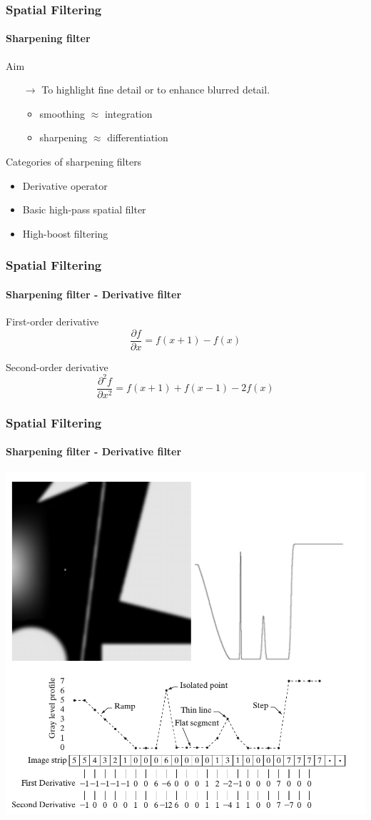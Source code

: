 \documentclass[table]{beamer}
\begin{document}
\begin{frame}
\frametitle{Spatial Filtering}
\framesubtitle{Sharpening filter}
\begin{block}{Aim}
\begin{itemize}
\item[$\rightarrow$] To highlight fine detail or to enhance blurred detail. 
\begin{itemize}
\item smoothing $\approx$ integration
\item sharpening $\approx$ differentiation
\end{itemize}
\end{itemize}
\end{block}
\begin{block}{Categories of sharpening filters}
\begin{itemize}
\item Derivative operator 
\item Basic high-pass spatial filter 
\item High-boost filtering 
\end{itemize}
\end{block}
\end{frame}
\begin{frame}
\frametitle{Spatial Filtering}
\framesubtitle{Sharpening filter - Derivative filter}
\begin{block}{First-order derivative}
$$\frac{\partial f}{\partial x} = f(x+1) - f(x)$$
\end{block}
\begin{block}{Second-order derivative}
$$\frac{\partial^{2}f}{\partial x^{2}} = f(x+1)+f(x-1) - 2f(x)$$
\end{block}
\end{frame}
\begin{frame}
\frametitle{Spatial Filtering}
\framesubtitle{Sharpening filter - Derivative filter}
\begin{center}
\includegraphics[scale=0.3]{images/Spatial7-derivative.png}
\end{center}
\end{frame}
\end{document}
